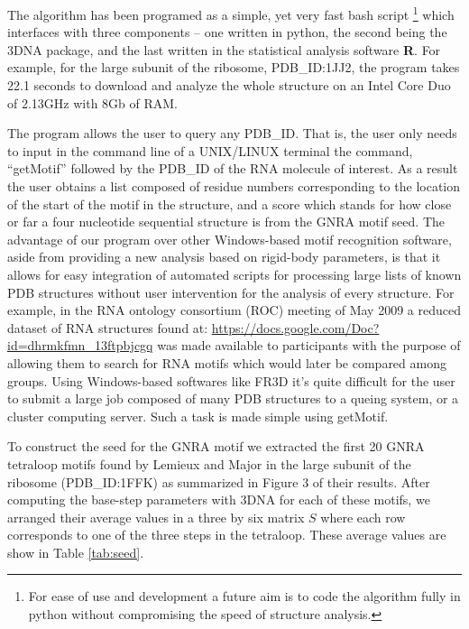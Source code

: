 The  algorithm has  been programed  as a  simple, yet  very  fast bash
script \footnote{For  ease of use and  development a future  aim is to
  code the algorithm fully in python without compromising the speed of
  structure analysis.}  which interfaces  with three components -- one
written in  python, the  second being the  3DNA package, and  the last
written in the statistical analysis software \textbf{R}.  For example,
for the large subunit of the ribosome, PDB\_ID:1JJ2, the program takes
22.1 seconds to  download and analyze the whole  structure on an Intel
Core Duo of 2.13GHz with 8Gb of RAM.

The program  allows the user to  query any PDB\_ID. That  is, the user
only needs to  input in the command line of  a UNIX/LINUX terminal the
command, ``getMotif'' followed  by the PDB\_ID of the  RNA molecule of
interest.  As  a result  the user obtains  a list composed  of residue
numbers corresponding to the location of the start of the motif in the
structure,  and a  score which  stands  for how  close or  far a  four
nucleotide  sequential structure  is from  the GNRA  motif  seed.  The
advantage of  our program  over other Windows-based  motif recognition
software,  aside from  providing a  new analysis  based  on rigid-body
parameters,  is  that it  allows  for  easy  integration of  automated
scripts  for processing large  lists of  known PDB  structures without
user intervention for the analysis of every structure. For example, in
the  RNA ontology  consortium  (ROC)  meeting of  May  2009 a  reduced
dataset        of        RNA        structures        found        at:
\url{https://docs.google.com/Doc?id=dhrmkfmn_13ftpbjcgq}    was   made
available to participants with the  purpose of allowing them to search
for  RNA motifs  which would  later be  compared among  groups.  Using
Windows-based  softwares   like  FR3D  \cite{sarver2008}   it's  quite
difficult for  the user  to submit  a large job  composed of  many PDB
structures to a  queing system, or a cluster  computing server. Such a
task is made simple using getMotif.

To construct  the seed for  the GNRA motif  we extracted the  first 20
GNRA tetraloop motifs found by Lemieux and Major \cite{lemieux2006} in
the  large subunit  of the  ribosome (PDB\_ID:1FFK)  as  summarized in
Figure 3  of their results.  After computing  the base-step parameters
with 3DNA for  each of these motifs, we  arranged their average values
in a three by six matrix $S$  where each row corresponds to one of the
three steps in the tetraloop.   These average values are show in Table
\ref{tab:seed}.

